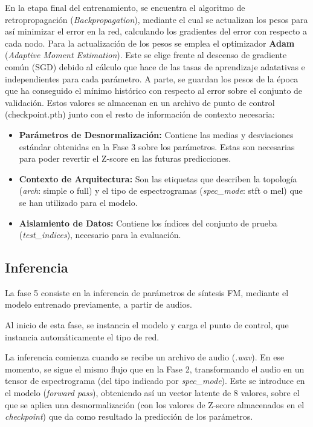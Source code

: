En la etapa final del entrenamiento, se encuentra el algoritmo de retropropagación (\textit{Backpropagation}), mediante el cual se actualizan
los pesos para así minimizar el error en la red, calculando los gradientes del error con respecto a cada nodo. 
Para la actualización de los pesos se emplea el optimizador \textbf{Adam} (\textit{Adaptive Moment Estimation}). Este se elige frente al descenso de gradiente común (SGD) debido al cálculo que hace 
de las tasas de aprendizaje adatativas e independientes para cada parámetro. A parte, se guardan los pesos de la época que ha conseguido 
el mínimo histórico con respecto al error sobre el conjunto de validación. Estos valores se almacenan en un archivo de punto de control (checkpoint.pth) junto
con el resto de información de contexto necesaria: 

\begin{itemize}
        \item \textbf{Parámetros de Desnormalización: } Contiene las medias y desviaciones estándar obtenidas en la Fase 3
        sobre los parámetros. Estas son necesarias para poder revertir el Z-score en las futuras predicciones. 
          
        \item \textbf{Contexto de Arquitectura: } Son las etiquetas que describen la topología (\textit{arch}: simple o full)
        y el tipo de espectrogramas (\textit{spec\_mode}: stft o mel) que se han utilizado para el modelo.
        
        \item \textbf{Aislamiento de Datos: } Contiene los índices del conjunto de prueba (\textit{test\_indices}), necesario para la evaluación.
        

\end{itemize}


\subsection{Inferencia}
La fase 5 consiste en la inferencia de parámetros de síntesis FM, mediante el modelo entrenado previamente, a partir
de audios. 

Al inicio de esta fase, se instancia el modelo y carga el punto de control, que instancia automáticamente
el tipo de red. 

La inferencia comienza cuando se recibe un archivo de audio (\textit{.wav}). En ese momento, se sigue el mismo flujo
que en la Fase 2, transformando el audio en un tensor de espectrograma (del tipo indicado por \textit{spec\_mode}). Este 
se introduce en el modelo (\textit{forward pass}), obteniendo así un vector latente de 8 valores, sobre el que se aplica
una desnormalización (con los valores de Z-score almacenados en el \textit{checkpoint}) que da como resultado la predicción de 
los parámetros. 

